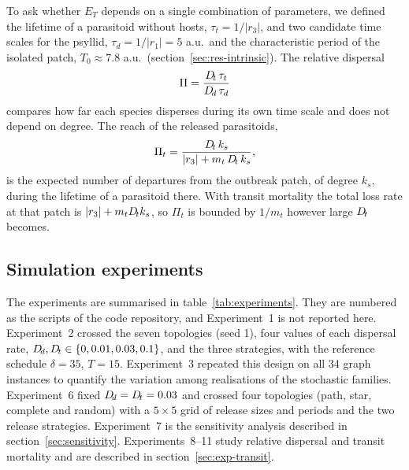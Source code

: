 To ask whether $E_T$ depends on a single combination of parameters, we defined the lifetime of a parasitoid without hosts, $\tau_t = 1/|r_3|$, and two candidate time scales for the psyllid, $\tau_d = 1/|r_1| = 5$ a.u.\ and the characteristic period of the isolated patch, $T_0 \approx 7.8$ a.u.\ (section~\ref{sec:res-intrinsic}). The relative dispersal
\begin{equation}
\Pi = \frac{D_{\!t}\,\tau_t}{D_{\!d}\,\tau_d}
\label{eq:Pi}
\end{equation}
compares how far each species disperses during its own time scale and does not depend on degree. The reach of the released parasitoids,
\begin{equation}
\Pi_t = \frac{D_{\!t}\,k_s}{|r_3| + m_t\,D_{\!t}\,k_s},
\label{eq:Pit}
\end{equation}
is the expected number of departures from the outbreak patch, of degree $k_s$, during the lifetime of a parasitoid there. With transit mortality the total loss rate at that patch is $|r_3| + m_tD_{\!t} k_s$, so $\Pi_t$ is bounded by $1/m_t$ however large $D_{\!t}$ becomes.

\subsection{Simulation experiments}
\label{sec:experiments}

The experiments are summarised in table~\ref{tab:experiments}. They are numbered as the scripts of the code repository, and Experiment~1 is not reported here. Experiment~2 crossed the seven topologies (seed 1), four values of each dispersal rate, $D_{\!d},D_{\!t}\in\{0, 0.01, 0.03, 0.1\}$, and the three strategies, with the reference schedule $\delta = 35$, $T = 15$. Experiment~3 repeated this design on all 34 graph instances to quantify the variation among realisations of the stochastic families. Experiment~6 fixed $D_{\!d} = D_{\!t} = 0.03$ and crossed four topologies (path, star, complete and random) with a $5\times5$ grid of release sizes and periods and the two release strategies. Experiment~7 is the sensitivity analysis described in section~\ref{sec:sensitivity}. Experiments~8--11 study relative dispersal and transit mortality and are described in section~\ref{sec:exp-transit}.

